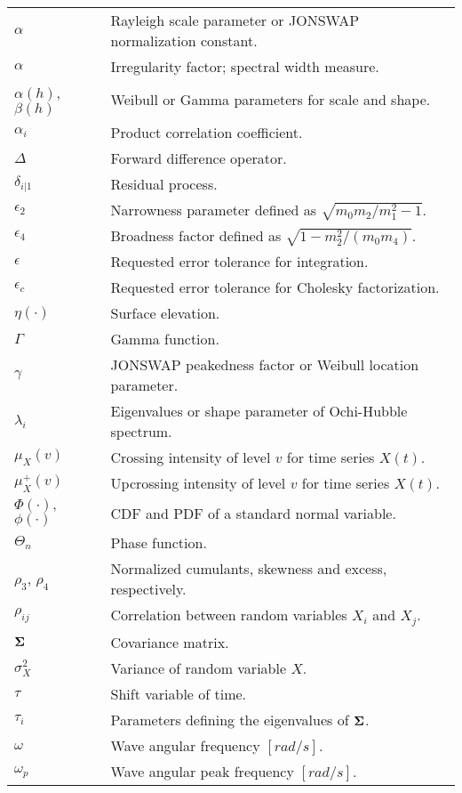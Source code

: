 \bigskip
\begin{tabular}[t]{p{23mm}p{125mm}}
  $\alpha$  & Rayleigh scale parameter or JONSWAP normalization
  constant. \\
  $\alpha$ & Irregularity factor; spectral width measure. \\
  $\alpha(h)$, $\beta(h)$ & Weibull or Gamma parameters for scale and
  shape. \\
 $\alpha_{i} $ & Product correlation coefficient.\\
  $\Delta$                & Forward difference operator. \\
  $\delta_{i|1}$          & Residual process.\\
  $\epsilon_{2}$          & Narrowness parameter
                            defined as $\sqrt{m_{0}m_{2}/m_{1}^{2}-1}$. \\
  $\epsilon_{4}$          & Broadness factor defined as
  $\sqrt{1-m_{2}^{2}/(m_{0} m_{4})}$. \\
  $\epsilon$ & Requested error tolerance for integration.\\
  $\epsilon_{c}$ & Requested error tolerance for Cholesky
  factorization.\\
 $\eta(\cdot)$ & Surface elevation. \\
  $\Gamma$ & Gamma function.\\
  $\gamma$ & JONSWAP peakedness factor or Weibull location
  parameter.\\
$\lambda_{i}$ & Eigenvalues or shape parameter of Ochi-Hubble spectrum.\\
  $\mu_{X}(v)$  & Crossing intensity of level $v$ for time series $X(t)$.\\
  $\mu_{X}^+(v)$  & Upcrossing intensity of level $v$ for time series $X(t)$.\\
  $\Phi(\cdot),$ $\phi(\cdot)$ & CDF and PDF of a standard normal
  variable.\\
  $\Theta_{n}$ & Phase function.\\
$\rho_{3}$, $\rho_{4}$  & Normalized cumulants, \ie{}
                          skewness and excess, respectively.\\
  $\rho_{ij}$             & Correlation between random variables
                            $X_{i}$ and $X_{j}$. \\
  $\mathbf{\Sigma} $           & Covariance matrix.  \\
  $\sigma_{X}^{2}$        & Variance of random variable $X$.\\
  $\tau$                  & Shift variable of time. \\
  $\tau_{i}$ & Parameters defining the eigenvalues of $\boldsymbol{\Sigma} $.\\
  $\omega$                & Wave angular frequency $[rad/s]$.\\
   $\omega_{p}$           & Wave angular peak frequency $[rad/s]$.\\
\end{tabular}

